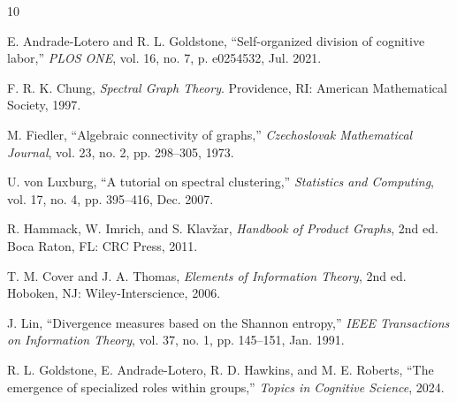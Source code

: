 \documentclass[journal]{IEEEtran}
\begin{document}

\begin{thebibliography}{10}

E. Andrade-Lotero and R. L. Goldstone, ``Self-organized division of cognitive labor,'' \textit{PLOS ONE}, vol. 16, no. 7, p. e0254532, Jul. 2021.

F. R. K. Chung, \textit{Spectral Graph Theory}. Providence, RI: American Mathematical Society, 1997.

M. Fiedler, ``Algebraic connectivity of graphs,'' \textit{Czechoslovak Mathematical Journal}, vol. 23, no. 2, pp. 298--305, 1973.

U. von Luxburg, ``A tutorial on spectral clustering,'' \textit{Statistics and Computing}, vol. 17, no. 4, pp. 395--416, Dec. 2007.

R. Hammack, W. Imrich, and S. Klav\v{z}ar, \textit{Handbook of Product Graphs}, 2nd ed. Boca Raton, FL: CRC Press, 2011.

T. M. Cover and J. A. Thomas, \textit{Elements of Information Theory}, 2nd ed. Hoboken, NJ: Wiley-Interscience, 2006.

J. Lin, ``Divergence measures based on the Shannon entropy,'' \textit{IEEE Transactions on Information Theory}, vol. 37, no. 1, pp. 145--151, Jan. 1991.

R. L. Goldstone, E. Andrade-Lotero, R. D. Hawkins, and M. E. Roberts, ``The emergence of specialized roles within groups,'' \textit{Topics in Cognitive Science}, 2024.

\end{thebibliography}
\end{document}
